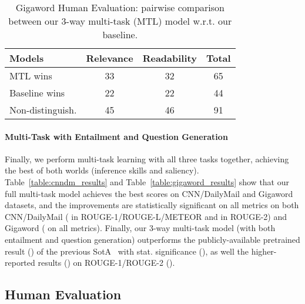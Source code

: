 \documentclass[11pt,a4paper]{article}
\begin{document}
\begin{table}[t]
\begin{small}
\begin{center}
\begin{tabular}{|l|c|c|c|}
\hline
Models & Relevance & Readability & Total \\
\hline
MTL wins & 33 & 32 & 65\\
Baseline wins & 22 & 22 & 44 \\
Non-distinguish. & 45 & 46 & 91 \\
\hline
\end{tabular}
\end{center}
\vspace{-10pt}
\caption{Gigaword Human Evaluation: pairwise comparison between our 3-way multi-task (MTL) model w.r.t. our baseline.
}
\label{table:human-eval-results_gigaword}
\vspace{-7pt}
\end{small}
\end{table}


\paragraph{Multi-Task with Entailment and Question Generation}
Finally, we perform multi-task learning with all three tasks together, achieving the best of both worlds (inference skills and saliency). Table~\ref{table:cnndm_results} and Table~\ref{table:gigaword_results} show that our full multi-task model achieves the best scores on CNN/DailyMail and Gigaword datasets, and the improvements are statistically significant on all metrics on both CNN/DailyMail ( in ROUGE-1/ROUGE-L/METEOR and  in ROUGE-2) and Gigaword ( on all metrics). 
Finally, our 3-way multi-task model (with both entailment and question generation) outperforms the publicly-available pretrained result () of the previous SotA~\cite{see2017get} with stat. significance (), as well the higher-reported results () on ROUGE-1/ROUGE-2 ().



\subsection{Human Evaluation}
\label{subsec:human-evaluation}
\end{document}
